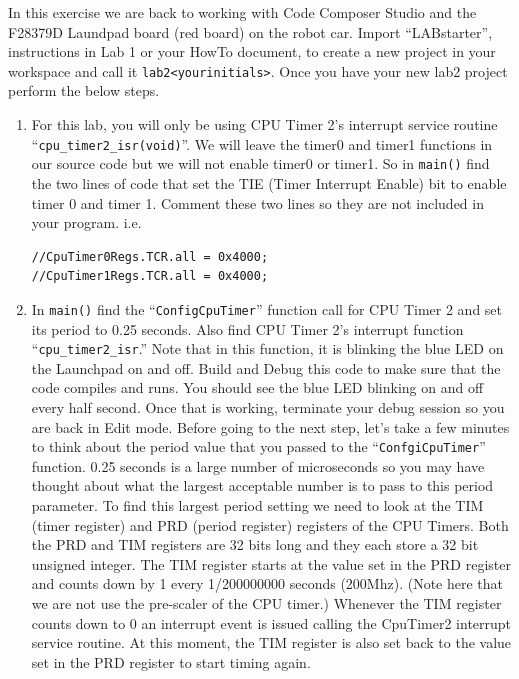 \documentclass[11pt]{article}
\begin{document}
In this exercise we are back to working with Code Composer Studio and the F28379D Laundpad board (red board) on the robot car. Import “LABstarter”, instructions in Lab 1 or your HowTo document, to create a new project in your workspace and call it \lstinline|lab2<yourinitials>|. Once you have your new lab2 project perform the below steps.
%
\begin{enumerate}
        \item For this lab, you will only be using CPU Timer 2’s interrupt service routine “\texttt{cpu_timer2_isr(void)}”. We will leave the timer0 and timer1 functions in our source code but we will not enable timer0 or timer1. So in \texttt{main()} find the two lines of code that set the TIE (Timer Interrupt Enable) bit to enable timer 0 and timer 1. Comment these two lines so they are not included in your program. i.e.
\begin{verbatim}
//CpuTimer0Regs.TCR.all = 0x4000;
//CpuTimer1Regs.TCR.all = 0x4000;
\end{verbatim}
        \item In \texttt{main()} find the “\texttt{ConfigCpuTimer}” function call for CPU Timer 2 and set its period to 0.25 seconds. Also find CPU Timer 2’s interrupt function “\texttt{cpu_timer2_isr}.” Note that in this function, it is blinking the blue LED on the Launchpad on and off. Build and Debug this code to make sure that the code compiles and runs. You should see the blue LED blinking on and off every half second. Once that is working, terminate your debug session so you are back in Edit mode. Before going to the next step, let’s take a few minutes to think about the period value that you passed to the “\texttt{ConfgiCpuTimer}” function. 0.25 seconds is a large number of microseconds so you may have thought about what the largest acceptable number is to pass to this period parameter. To find this largest period setting we need to look at the TIM (timer register) and PRD (period register) registers of the CPU Timers. Both the PRD and TIM registers are 32 bits long and they each store a 32 bit unsigned integer. The TIM register starts at the value set in the PRD register and counts down by 1 every 1/200000000 seconds (200Mhz). (Note here that we are not use the pre-scaler of the CPU timer.) Whenever the TIM register counts down to 0 an interrupt event is issued calling the CpuTimer2 interrupt service routine. At this moment, the TIM register is also set back to the value set in the PRD register to start timing again.

\end{enumerate}
\end{document}
